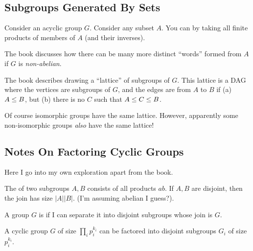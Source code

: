 \subsection{Subgroups Generated By Sets}

\begin{definition}
  Consider an acyclic group $G$. Consider any subset $A$. You can
   by taking all finite products of
  members of $A$ (and their inverses).
\end{definition}

\begin{remark}
  The book discusses how there can be many more distinct ``words''
  formed from $A$ if $G$ is \emph{non-abelian}.
\end{remark}

\begin{remark}
  The book describes drawing a ``lattice'' of subgroups of $G$. This
  lattice is a DAG where the vertices are subgroups of $G$, and the
  edges are from $A$ to $B$ if (a) $A \leq B$, but (b) there is no
  $C$ such that $A \leq C \leq B$.

  Of course isomorphic groups have the same lattice. However, apparently
  some non-isomorphic groups \emph{also} have the same lattice!
\end{remark}

\subsection{Notes On Factoring Cyclic Groups}

\begin{remark}
  Here I go into my own exploration apart from the book.
\end{remark}

\begin{definition}
  The  of two subgroups $A, B$ consists of all products
  $ab$. If $A, B$ are disjoint, then the join has size $|A||B|$. (I'm
  assuming abelian I guess?).

  A group $G$ is  if I can separate it into disjoint
  subgroups whose join is $G$.
\end{definition}

\begin{theorem}
  A cyclic group $G$ of size $\prod_i p_i^{k_i}$ can be factored into
  disjoint subgroups $G_i$ of size $p_i^{k_i}$.
\end{theorem}

